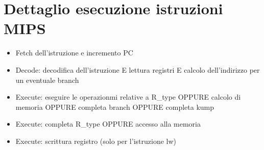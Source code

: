 \documentclass[12pt, a4paper, openany]{book}
\begin{document}
\section{Dettaglio esecuzione istruzioni MIPS}
\begin{itemize}
    \item Fetch dell'istruzione e incremento PC
    \item Decode: decodifica dell'istruzione E lettura registri E calcolo
    dell'indirizzo per un eventuale branch
    \item Execute: eseguire le operazionmi relative a R\_type OPPURE calcolo di memoria
    OPPURE completa branch OPPURE completa kump
    \item Execute: completa R\_type OPPURE accesso alla memoria
    \item Execute: scrittura registro (solo per l'istruzione lw)
\end{itemize}

\subsection*{}

\end{document}
